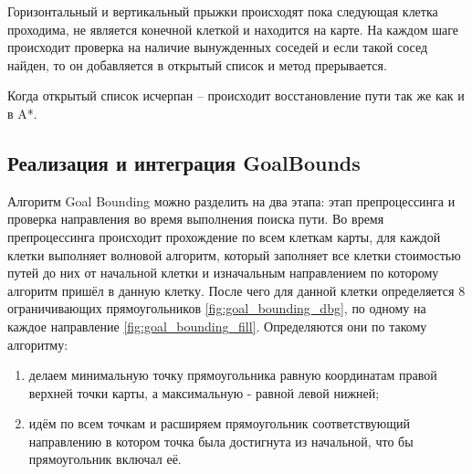 {
	\mybox[x=1,y=1,color=grey]
	\mybox[x=1,y=2,color=grey]
	\mybox[x=1,y=3,color=grey]
	\mybox[x=2,y=1,color=grey]
	\mybox[x=3,y=1,color=grey]
	\mybox[x=3,y=1,color=grey]
	\mybox[x=2,y=3,color=black]
	\mybox[x=3,y=2,color=black]
	\mybox[x=2,y=2,color=green]
	
	\mygrid[width=5, height=5]
	
	\myarrow[startx=0,starty=0,endx=1,endy=1,color=darkgrey]
	\myarrow[startx=1,starty=1,endx=1,endy=2,color=darkgrey]
	\myarrow[startx=1,starty=2,endx=1,endy=3,color=darkgrey]
	\myarrow[startx=1,starty=1,endx=2,endy=1,color=darkgrey]
	\myarrow[startx=2,starty=1,endx=3,endy=1,color=darkgrey]
	\myarrow[startx=1,starty=1,endx=2,endy=2,color=darkgrey]
	\myarrow[startx=2,starty=2,endx=2,endy=3,color=red]
	\myarrow[startx=2,starty=2,endx=3,endy=2,color=red]
	\myarrow[startx=2,starty=2,endx=3,endy=3,color=red]
}
  
Горизонтальный и вертикальный прыжки происходят пока следующая клетка проходима, не является конечной клеткой и находится на карте. На каждом шаге происходит проверка на наличие вынужденных соседей и если такой сосед найден, то он добавляется в открытый список и метод прерывается. 

Когда открытый список исчерпан -- происходит восстановление пути так же как и в A*.

\subsection{Реализация и интеграция GoalBounds}

Алгоритм Goal Bounding можно разделить на два этапа: этап препроцессинга и проверка направления во время выполнения поиска пути. Во время препроцессинга происходит прохождение по всем клеткам карты, для каждой клетки выполняет волновой алгоритм, который заполняет все клетки стоимостью путей до них от начальной клетки и изначальным направлением по которому алгоритм пришёл в данную клетку. После чего для данной клетки определяется 8 ограничивающих прямоугольников \cref{fig:goal_bounding_dbg}, по одному на каждое направление \cref{fig:goal_bounding_fill}. Определяются они по такому алгоритму: 

\begin{enumerate}
	\item делаем минимальную точку прямоугольника равную координатам правой верхней точки карты, а максимальную - равной левой нижней;
	\item идём по всем точкам и расширяем прямоугольник соответствующий направлению в котором точка была достигнута из начальной, что бы прямоугольник включал её. 
\end{enumerate}

